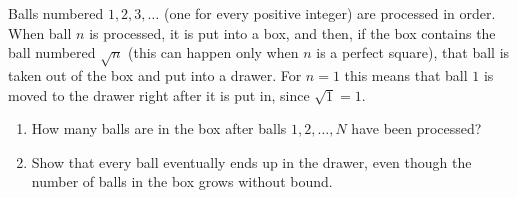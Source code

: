 Balls numbered $1,2,3,\dots$ (one for every positive integer) are processed in order. When ball $n$ is processed, it is put into a box, and then, if the box contains the ball numbered $\sqrt n$ (this can happen only when $n$ is a perfect square), that ball is taken out of the box and put into a drawer. For $n=1$ this means that ball $1$ is moved to the drawer right after it is put in, since $\sqrt1=1$.
\begin{enumerate}
\item[(a)] How many balls are in the box after balls $1,2,\dots,N$ have been processed?
\item[(b)] Show that every ball eventually ends up in the drawer, even though the number of balls in the box grows without bound.
\end{enumerate}
